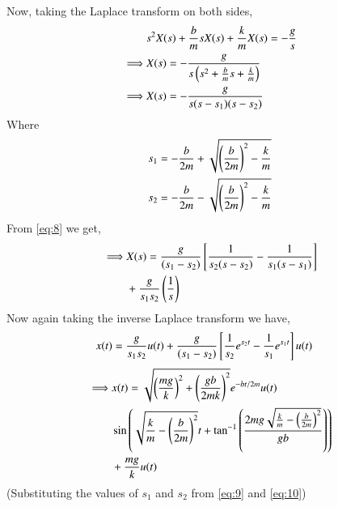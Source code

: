 \documentclass[journal,12pt,twocolumn]{IEEEtran}
\theoremstyle{remark}
\begin{document}
    Now, taking the Laplace transform on both sides,
    \begin{align}
        &s^2X(s)+\frac{b}{m}sX(s)+\frac{k}{m}X(s)=-\frac{g}{s} \\
        \implies &X(s)=-\frac{g}{s\left(s^2+\frac{b}{m}s+\frac{k}{m}\right)} \\
        \implies &X(s)=-\frac{g}{s(s-s_1)(s-s_2)} \label{eq:8}
    \end{align}
    Where
    \begin{align}
        &s_1=-\frac{b}{2m}+\sqrt{\left(\frac{b}{2m}\right)^2-\frac{k}{m}} \label{eq:9}\\
        &s_2=-\frac{b}{2m}-\sqrt{\left(\frac{b}{2m}\right)^2-\frac{k}{m}} \label{eq:10}
    \end{align}
    From \eqref{eq:8} we get,
    \begin{align}
        \begin{split}
            \implies &X(s)=\frac{g}{(s_1-s_2)}{}\left[\frac{1}{s_2(s-s_2)}-\frac{1}{s_1(s-s_1)}\right] \\
            &+\frac{g}{s_1s_2}\left(\frac{1}{s}\right)
        \end{split}
    \end{align}
    Now again taking the inverse Laplace transform we have,
    \begin{align}
        &x(t)=\frac{g}{s_1s_2}u(t)+\frac{g}{(s_1-s_2)}{}\left[\frac{1}{s_2}e^{s_2t}-\frac{1}{s_1}e^{s_1t}\right]u(t)
    \end{align}
    \begin{align}
    \begin{split}
    \implies &x(t) =\sqrt{\left(\frac{mg}{k}\right)^2 + \left(\frac{gb}{2mk}\right)^2}e^{-bt/2m}u(t) \\
            &\sin{\ensuremath{\left(\sqrt{\frac{k}{m} - \left(\frac{b}{2m}\right)^2}t + \tan^{-1}\left(\frac{2mg\sqrt{\frac{k}{m} - \left(\frac{b}{2m}\right)^2}}{gb}\right)\right)}} \\
            &+ \frac{mg}{k}
        u(t) \label{eq:13}
\end{split}
\end{align}
    (Substituting the values of $s_1$ and $s_2$ from \eqref{eq:9} and \eqref{eq:10})
\end{document}
